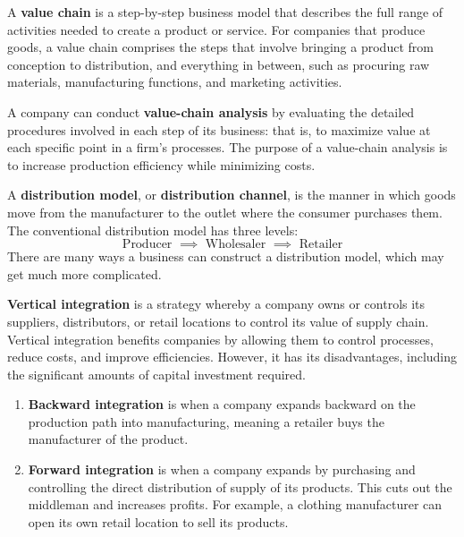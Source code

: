 \documentclass{article}
\begin{document}
      \begin{definition}
        A \textbf{value chain} is a step-by-step business model that describes the full range of activities needed to create a product or service. For companies that produce goods, a value chain comprises the steps that involve bringing a product from conception to distribution, and everything in between, such as procuring raw materials, manufacturing functions, and marketing activities. 

        A company can conduct \textbf{value-chain analysis} by evaluating the detailed procedures involved in each step of its business: that is, to maximize value at each specific point in a firm's processes. The purpose of a value-chain analysis is to increase production efficiency while minimizing costs. 
      \end{definition}

      \begin{definition}
        A \textbf{distribution model}, or \textbf{distribution channel}, is the manner in which goods move from the manufacturer to the outlet where the consumer purchases them. The conventional distribution model has three levels:
        \[\text{Producer } \implies \text{ Wholesaler } \implies \text{ Retailer}\]
        There are many ways a business can construct a distribution model, which may get much more complicated. 
      \end{definition}

      \begin{definition}
        \textbf{Vertical integration} is a strategy whereby a company owns or controls its suppliers, distributors, or retail locations to control its value of supply chain. Vertical integration benefits companies by allowing them to control processes, reduce costs, and improve efficiencies. However, it has its disadvantages, including the significant amounts of capital investment required. 
        \begin{enumerate}
            \item \textbf{Backward integration} is when a company expands backward on the production path into manufacturing, meaning a retailer buys the manufacturer of the product. 
            \item \textbf{Forward integration} is when a company expands by purchasing and controlling the direct distribution of supply of its products. This cuts out the middleman and increases profits. For example, a clothing manufacturer can open its own retail location to sell its products. 
        \end{enumerate}
      \end{definition}
\end{document}
